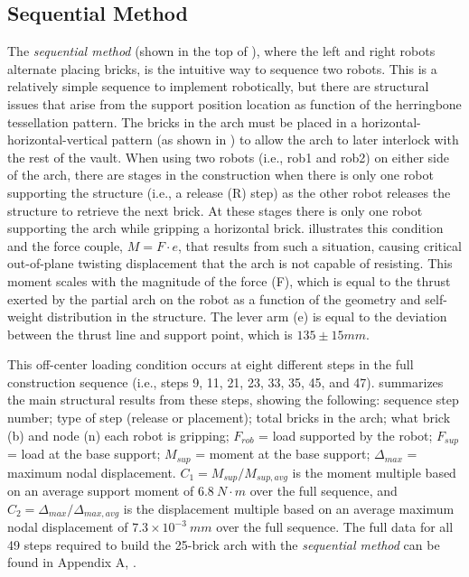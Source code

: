 \subsection{Sequential Method} \label{sec:sequential}
The \textit{sequential method} (shown in the top of ), where the left and right robots alternate placing bricks, is the intuitive way to sequence two robots. This is a relatively simple sequence to implement robotically, but there are structural issues that arise from the support position location as function of the herringbone tessellation pattern. The bricks in the arch must be placed in a horizontal-horizontal-vertical pattern (as shown in ) to allow the arch to later interlock with the rest of the vault. When using two robots (i.e., rob1 and rob2) on either side of the arch, there are stages in the construction when there is only one robot supporting the structure (i.e., a release (R) step) as the other robot releases the structure to retrieve the next brick. At these stages there is only one robot supporting the arch while gripping a horizontal brick.  illustrates this condition and the force couple, $M = F \cdot e$, that results from such a situation, causing critical out-of-plane twisting displacement that the arch is not capable of resisting. This moment scales with the magnitude of the force (F), which is equal to the thrust exerted by the partial arch on the robot as a function of the geometry and self-weight distribution in the structure. The lever arm (e) is equal to the deviation between the thrust line and support point, which is $135 \pm 15 mm$.

This off-center loading condition occurs at eight different steps in the full construction sequence (i.e., steps 9, 11, 21, 23, 33, 35, 45, and 47).  summarizes the main structural results from these steps, showing the following: sequence step number; type of step (release or placement); total bricks in the arch; what brick (b) and node (n) each robot is gripping; $F_{rob}$ = load supported by the robot; $F_{sup}$ = load at the base support; $M_{sup}$ = moment at the base support; $\Delta_{max}$ = maximum nodal displacement. $C_1 = M_{sup}/M_{sup,avg}$ is the moment multiple based on an average support moment of $6.8 \: N \cdot m$ over the full sequence, and $C_2 = \Delta_{max}/\Delta_{max,avg}$ is the displacement multiple based on an average maximum nodal displacement of $7.3 \times 10^{-3} \: mm$ over the full sequence. The full data for all 49 steps required to build the 25-brick arch with the \textit{sequential method} can be found in Appendix A, .

